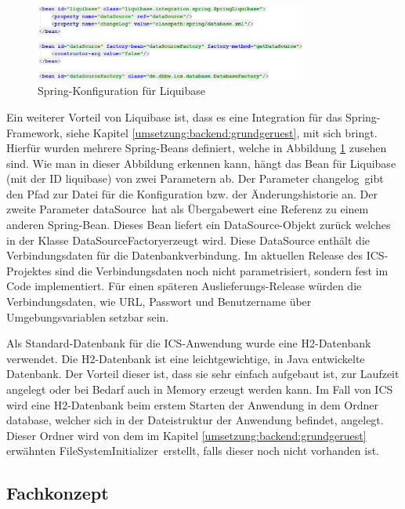 \begin{figure}[H]
	\centering 
	\includegraphics[width=0.8\textwidth]{img/liquibase_beans}
	\captionsetup{format=hang}
	\caption[Spring-Konfiguration für Liquibase]{\label{fig:liquibase_spring}Spring-Konfiguration für Liquibase}
\end{figure}

Ein weiterer Vorteil von Liquibase ist, dass es eine Integration für das Spring-Framework, siehe Kapitel \ref{umsetzung:backend:grundgeruest}, mit sich bringt. Hierfür wurden mehrere Spring-Beans definiert, welche in Abbildung \ref{fig:liquibase_spring} zusehen sind. Wie man in dieser Abbildung erkennen kann, hängt das Bean für Liquibase (mit der \ac{ID} \glqq liquibase\grqq) von zwei Parametern ab. Der Parameter \glqq changelog\grqq \, gibt den Pfad zur Datei für die Konfiguration bzw. der Änderungshistorie an. Der zweite Parameter \glqq dataSource\grqq \, hat als Übergabewert eine Referenz zu einem anderen Spring-Bean. Dieses Bean liefert ein \glqq DataSource\grqq-Objekt zurück welches in der Klasse \glqq DataSourceFactory\grqq erzeugt wird. Diese DataSource enthält die Verbindungsdaten für die Datenbankverbindung. Im aktuellen Release des \ac{ICS}-Projektes sind die Verbindungsdaten noch nicht parametrisiert, sondern fest im Code implementiert. Für einen späteren Auslieferungs-Release würden die Verbindungsdaten, wie URL, Passwort und Benutzername über Umgebungsvariablen setzbar sein.

Als Standard-Datenbank für die \ac{ICS}-Anwendung wurde eine H2-Datenbank verwendet. Die H2-Datenbank ist eine leichtgewichtige, in Java entwickelte Datenbank.\autocite{H2} Der Vorteil dieser ist, dass sie sehr einfach aufgebaut ist, zur Laufzeit angelegt oder bei Bedarf auch in Memory erzeugt werden kann. Im Fall von \ac{ICS} wird eine H2-Datenbank beim erstem Starten der Anwendung in dem Ordner \glqq database\grqq, welcher sich in der Dateistruktur der Anwendung befindet, angelegt. Dieser Ordner wird von dem im Kapitel \ref{umsetzung:backend:grundgeruest} erwähnten \glqq FileSystemInitializer\grqq \, erstellt, falls dieser noch nicht vorhanden ist.

\subsection{Fachkonzept}


